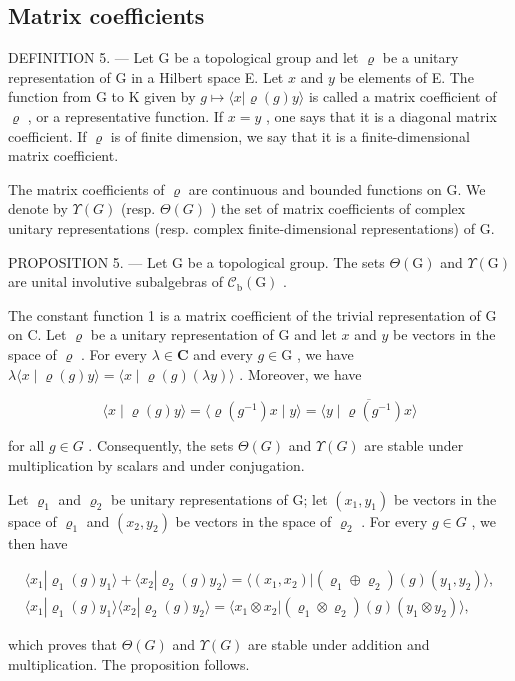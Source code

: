 \subsection{Matrix coefficients}

DEFINITION 5. --- Let G be a topological group and let \(\varrho\) be a unitary representation of G in a Hilbert space E. Let \(x\) and \(y\) be elements of E. The function from G to K given by \(g \mapsto \langle x | \varrho(g)y \rangle\) is called a matrix coefficient of \(\varrho\) , or a representative function. If \(x = y\) , one says that it is a diagonal matrix coefficient. If \(\varrho\) is of finite dimension, we say that it is a finite-dimensional matrix coefficient.

The matrix coefficients of \(\varrho\) are continuous and bounded functions on G. We denote by \(\Upsilon(G)\) (resp. \(\Theta(G)\) ) the set of matrix coefficients of complex unitary representations (resp. complex finite-dimensional representations) of G.

PROPOSITION 5. — Let G be a topological group. The sets \(\Theta(\mathrm{G})\) and \(\Upsilon(\mathrm{G})\) are unital involutive subalgebras of \(\mathcal{C}_{\mathrm{b}}(\mathrm{G})\) .

The constant function 1 is a matrix coefficient of the trivial representation of G on C. Let \(\varrho\) be a unitary representation of G and let \(x\) and \(y\) be vectors in the space of \(\varrho\) . For every \(\lambda \in \mathbf{C}\) and every \(g \in \mathrm{G}\) , we have \(\lambda \langle x \mid \varrho(g)y \rangle = \langle x \mid \varrho(g)(\lambda y) \rangle\) . Moreover, we have

\[
\langle x \mid \varrho (g) y \rangle = \langle \varrho (g ^ {- 1}) x \mid y \rangle = \overline {{\langle y \mid \varrho (g ^ {- 1}) x \rangle}}
\]

for all \(g \in G\) . Consequently, the sets \(\Theta(G)\) and \(\Upsilon(G)\) are stable under multiplication by scalars and under conjugation.

Let \(\varrho_{1}\) and \(\varrho_{2}\) be unitary representations of G; let \((x_{1}, y_{1})\) be vectors in the space of \(\varrho_{1}\) and \((x_{2}, y_{2})\) be vectors in the space of \(\varrho_{2}\) . For every \(g \in G\) , we then have

\[
\begin{array}{c} \langle x _ {1}   |   \varrho_ {1} (g) y _ {1} \rangle + \langle x _ {2}   |   \varrho_ {2} (g) y _ {2} \rangle = \langle (x _ {1}, x _ {2})   |   (\varrho_ {1} \oplus \varrho_ {2}) (g) (y _ {1}, y _ {2}) \rangle , \\ \langle x _ {1}   |   \varrho_ {1} (g) y _ {1} \rangle \langle x _ {2}   |   \varrho_ {2} (g) y _ {2} \rangle = \langle x _ {1} \otimes x _ {2}   |   (\varrho_ {1} \otimes \varrho_ {2}) (g) (y _ {1} \otimes y _ {2}) \rangle , \end{array}
\]

which proves that \(\Theta(G)\) and \(\Upsilon(G)\) are stable under addition and multiplication. The proposition follows.

